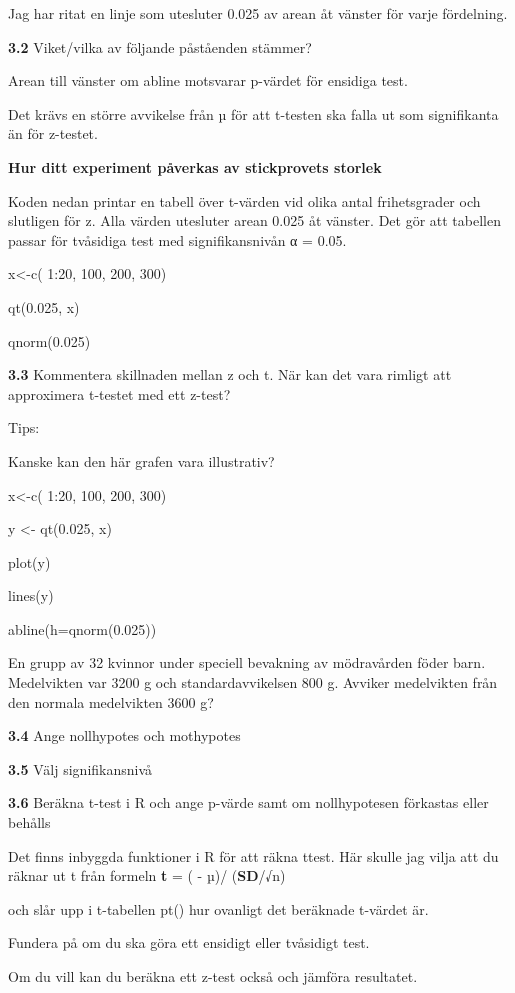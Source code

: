 \documentclass[
  letterpaper,
  DIV=11,
  numbers=noendperiod]{scrartcl}
\begin{document}
Jag har ritat en linje som utesluter 0.025 av arean åt vänster för varje
fördelning.

\textbf{3.2} Viket/vilka av följande påståenden stämmer?

Arean till vänster om abline motsvarar p-värdet för ensidiga test.

Det krävs en större avvikelse från µ för att t-testen ska falla ut som
signifikanta än för z-testet.

\textbf{Hur ditt experiment påverkas av stickprovets storlek}

Koden nedan printar en tabell över t-värden vid olika antal
frihetsgrader och slutligen för z. Alla värden utesluter arean 0.025 åt
vänster. Det gör att tabellen passar för tvåsidiga test med
signifikansnivån α = 0.05.

x\textless-c( 1:20, 100, 200, 300)

qt(0.025, x)

qnorm(0.025)

\textbf{3.3} Kommentera skillnaden mellan z och t. När kan det vara
rimligt att approximera t-testet med ett z-test?

Tips:

Kanske kan den här grafen vara illustrativ?

x\textless-c( 1:20, 100, 200, 300)

y \textless- qt(0.025, x)

plot(y)

lines(y)

abline(h=qnorm(0.025))

En grupp av 32 kvinnor under speciell bevakning av mödravården föder
barn. Medelvikten var 3200 g och standardavvikelsen 800 g. Avviker
medelvikten från den normala medelvikten 3600 g?

\textbf{3.4} Ange nollhypotes och mothypotes

\textbf{3.5} Välj signifikansnivå

\textbf{3.6} Beräkna t-test i R och ange p-värde samt om nollhypotesen
förkastas eller behålls

Det finns inbyggda funktioner i R för att räkna ttest. Här skulle jag
vilja att du räknar ut t från formeln \textbf{t} = ( - µ)/
(\textbf{SD}/√n)

och slår upp i t-tabellen pt() hur ovanligt det beräknade t-värdet är.

Fundera på om du ska göra ett ensidigt eller tvåsidigt test.

Om du vill kan du beräkna ett z-test också och jämföra resultatet.
\end{document}

